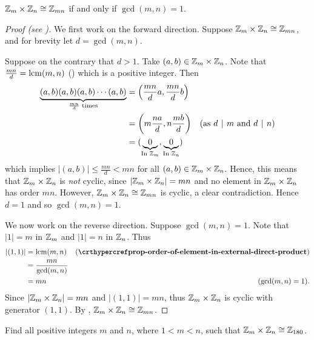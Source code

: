 \begin{theorem}\label{thrm-Zm-cross-Zn-isomorphic-to-Zmn-condition}
    $\mathbb{Z}_m \times \mathbb{Z}_n \cong \mathbb{Z}_{mn}$ if and only if $\gcd(m,n) = 1$.
\end{theorem}
\begin{proof}[Proof (see {\cite[Proposition 13.1 (3)]{humphreys_1996}})]
    We first work on the forward direction. Suppose $\mathbb{Z}_m \times \mathbb{Z}_n \cong \mathbb{Z}_{mn}$, and for brevity let $d = \gcd(m,n)$.

    Suppose on the contrary that $d > 1$. Take $(a, b) \in \mathbb{Z}_m \times \mathbb{Z}_n$. Note that $\frac{mn}{d} = \mathrm{lcm}(m,n)$ () which is a positive integer. Then
    \begin{align*}
        \underbrace{(a,b)(a,b)(a,b)\cdots(a,b)}_{\frac{mn}{d}\text{ times}} &= \left(\frac{mn}{d}a, \frac{mn}{d}b\right)\\
        &= \left(m\frac{na}{d}, n\frac{mb}{d}\right) & (\text{as } d \vert m \text{ and } d \vert n)\\
        &= (\underbrace{0}_{\text{In } \Z_m}, \underbrace{0}_{\text{In } \Z_n})
    \end{align*}
    which implies $|(a, b)| \leq \frac{mn}{d} < mn$ for all $(a, b) \in \mathbb{Z}_m \times \mathbb{Z}_n$. Hence, this means that $\mathbb{Z}_m \times \mathbb{Z}_n$ is \textit{not} cyclic, since $|\mathbb{Z}_m \times \mathbb{Z}_n| = mn$ and no element in $\mathbb{Z}_m \times \mathbb{Z}_n$ has order $mn$. However, $\mathbb{Z}_m \times \mathbb{Z}_n \cong \mathbb{Z}_{mn}$ is cyclic, a clear contradiction. Hence $d = 1$ and so $\gcd(m,n) = 1$.

    We now work on the reverse direction. Suppose $\gcd(m,n) = 1$. Note that $|1| = m$ in $\mathbb{Z}_m$ and $|1| = n$ in $\mathbb{Z}_n$. Thus
    \begin{align*}
        |(1, 1)| &= \lcm(m, n) & (\myref{prop-order-of-element-in-external-direct-product})\\
        &= \frac{mn}{\gcd(m,n)}\\
        &= mn & (\gcd(m,n) = 1).
    \end{align*}
    Since $|\mathbb{Z}_m \times \mathbb{Z}_n| = mn$ and $|(1,1)| = mn$, thus $\mathbb{Z}_m \times \mathbb{Z}_n$ is cyclic with generator $(1,1)$. By , $\mathbb{Z}_m \times \mathbb{Z}_n \cong \mathbb{Z}_{mn}$.
\end{proof}

\begin{exercise}
    Find all positive integers $m$ and $n$, where $1 < m < n$, such that $\mathbb{Z}_m \times \mathbb{Z}_n \cong \mathbb{Z}_{180}$.
\end{exercise}

